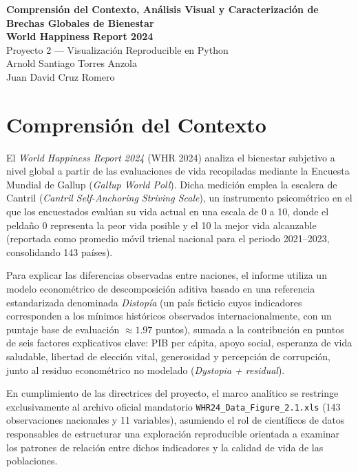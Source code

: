 \documentclass[11pt]{article}
\begin{document}
\begin{center}
    {\Large \textbf{Comprensión del Contexto, Análisis Visual y Caracterización de Brechas Globales de Bienestar}}\\[0.3em]
    {\large \textbf{World Happiness Report 2024}}\\[0.4em]
    {\normalsize Proyecto 2 --- Visualización Reproducible en Python}\\[0.6em]
    Arnold Santiago Torres Anzola\\
    Juan David Cruz Romero
\end{center}

\vspace{0.2em}

\section{Comprensión del Contexto}

El \textit{World Happiness Report 2024} (WHR 2024) analiza el bienestar subjetivo a nivel global a partir de las evaluaciones de vida recopiladas mediante la Encuesta Mundial de Gallup (\textit{Gallup World Poll}). Dicha medición emplea la escalera de Cantril (\textit{Cantril Self-Anchoring Striving Scale}), un instrumento psicométrico en el que los encuestados evalúan su vida actual en una escala de 0 a 10, donde el peldaño 0 representa la peor vida posible y el 10 la mejor vida alcanzable (reportada como promedio móvil trienal nacional para el periodo 2021--2023, consolidando 143 países).

Para explicar las diferencias observadas entre naciones, el informe utiliza un modelo econométrico de descomposición aditiva basado en una referencia estandarizada denominada \textit{Distopía} (un país ficticio cuyos indicadores corresponden a los mínimos históricos observados internacionalmente, con un puntaje base de evaluación $\approx 1.97$ puntos), sumada a la contribución en puntos de seis factores explicativos clave: PIB per cápita, apoyo social, esperanza de vida saludable, libertad de elección vital, generosidad y percepción de corrupción, junto al residuo econométrico no modelado (\textit{Dystopia + residual}).

En cumplimiento de las directrices del proyecto, el marco analítico se restringe exclusivamente al archivo oficial mandatorio \texttt{WHR24\_Data\_Figure\_2.1.xls} (143 observaciones nacionales y 11 variables), asumiendo el rol de científicos de datos responsables de estructurar una exploración reproducible orientada a examinar los patrones de relación entre dichos indicadores y la calidad de vida de las poblaciones.
\end{document}
